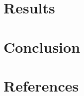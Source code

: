 \documentclass[
  twoside,
  openright,
  degree    = master,               %
  language  = english,              %
  fontset   = overleaf,             %
  watermark = true,                 %
  doi       = true,                 %
]{ntuthesis}
\begin{document}
\hypertarget{sec:results}{%
\chapter{Results}\label{sec:results}}

\hypertarget{sec:conclusion}{%
\chapter{Conclusion}\label{sec:conclusion}}

\hypertarget{references}{%
\chapter*{References}\label{references}}

\hypertarget{refs}{}
\end{document}
